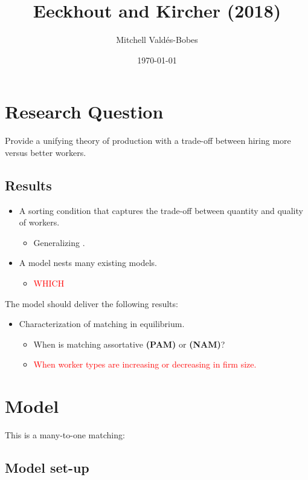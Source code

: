 \documentclass[12pt]{article}
\title{Eeckhout and Kircher (2018)}
\author{Mitchell Valdés-Bobes}
\date{\today}
\theoremstyle{definition}
\begin{document}
\maketitle

\section{Research Question}
Provide a unifying theory of production with a trade-off between hiring more versus better workers.

\subsection{Results}
\begin{itemize}
    \item  A sorting condition that captures the trade-off between quantity and quality of workers. 
\begin{itemize}
    \item Generalizing \cite{becker1973theory}.
\end{itemize}
    \item  A model nests many existing models.
    \begin{itemize}
        \item \textcolor{red}{WHICH}
    \end{itemize}
\end{itemize}

The model should deliver the following results:
\begin{itemize}
    \item Characterization of matching in equilibrium.
    \begin{itemize}
        \item When is matching assortative \textbf{(PAM)} or \textbf{(NAM)}?
        \item \textcolor{red}{When worker types are increasing or decreasing in firm size.}
    \end{itemize}
\end{itemize}

\section{Model}
This is a many-to-one matching:

\subsection{Model set-up}
\end{document}
